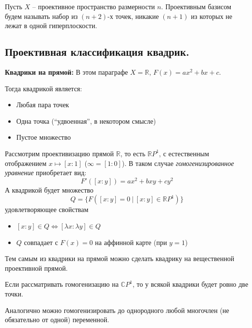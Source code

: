 \documentclass[11pt]{article}
\begin{document}
    \begin{definition}
        Пусть $X$ -- проективное пространство размерности $n$.  Проективным базисом будем называть набор из  $(n + 2)$-х точек, никакие $(n + 1)$ из которых не лежат в одной  гиперплоскости.
    \end{definition}
    \subsection{Проективная классификация квадрик.}
    \textsf{\textbf{Квадрики на прямой:}}
    В этом параграфе $X = \mathbb{R}$, $F(x) = ax^2 + bx + c$.

    Тогда квадрикой является:
    \begin{itemize}
        \item Любая пара точек
        \item Одна точка (``удвоенная'', в некотором смысле)
        \item Пустое множество
    \end{itemize}

    Рассмотрим проективизацию прямой $\mathbb{R}$, то есть $ \mathbb{R}P^1$, с естественным отображением $x \mapsto [x:1]$ ($\infty = [1:0]$). В таком случае \emph{гомогенизированное уравнение} приобретает вид:
    \begin{equation*}
        F'([x:y]) = ax^2 + bxy + cy^2
    \end{equation*}
    А квадрикой будет множество
    \begin{equation*}
        Q = \{F([x : y] = 0 \ |\ [x:y] \in \mathbb{R}P^1)\}
    \end{equation*}
    удовлетворяющее свойствам
    \begin{itemize}
        \item $[x:y] \in Q \Longleftrightarrow [\lambda x:\lambda y] \in Q$
        \item $Q$ совпадает с $F(x) = 0$ на аффинной карте (при $y = 1$)
    \end{itemize}
    Тем самым из квадрики на прямой можно сделать квадрику на вещественной проективной прямой.

    \begin{remark}
    Если рассматривать гомогенизацию на $\mathbb{C}P^1$, то у всякой квадрики будет ровно две точки.
    \end{remark}

    \begin{remark}
    Аналогично можно гомогенизировать до однородного любой многочлен (не обязательно от одной) переменной.
    \end{remark}
\end{document}
